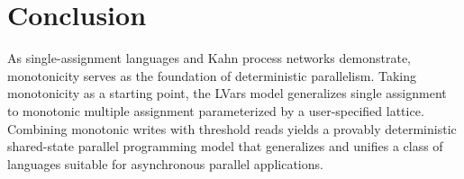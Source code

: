 \chapter{Conclusion}\label{ch:conclusion} %



As single-assignment languages and Kahn process networks demonstrate,
monotonicity serves as the foundation of deterministic parallelism.
Taking monotonicity as a starting point, the LVars model generalizes
single assignment to monotonic multiple assignment parameterized by a
user-specified lattice.  Combining monotonic writes with threshold
reads yields a provably deterministic shared-state parallel
programming model that generalizes and unifies a class of languages
suitable for asynchronous parallel applications.

